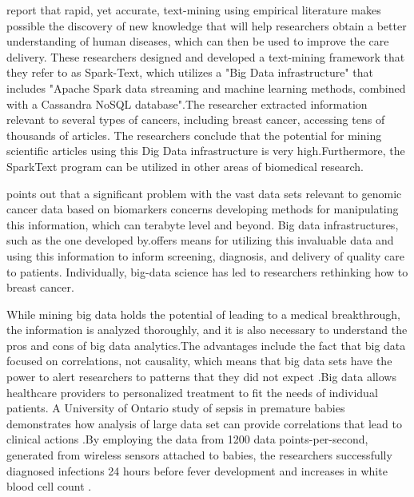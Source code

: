 \documentclass[sigconf]{acmart}
\begin{document}
\cite{ye2016}report that rapid, yet accurate, text-mining using empirical literature makes possible the discovery of new knowledge that will help researchers obtain a better understanding of human diseases, which can then be used to improve the care delivery. These researchers designed and developed a text-mining framework that they refer to as Spark-Text, which utilizes a "Big Data infrastructure" that includes "Apache Spark data streaming and machine learning methods, combined with a Cassandra NoSQL database"\cite{ye2016}.The researcher extracted information relevant to several types of cancers, including breast cancer, accessing tens of thousands of articles. The researchers conclude that the potential for mining scientific articles using this Dig Data infrastructure is very high\cite{ye2016}.Furthermore, the SparkText program can be utilized in other areas of biomedical research\cite{ye2016}.

\cite{savage2014}points out that a significant problem with the vast data sets relevant to genomic cancer data based on biomarkers concerns developing methods for manipulating this information, which can terabyte level and beyond. Big data infrastructures, such as the one developed by\cite{ye2016}.offers means for utilizing this invaluable data and using this information to inform screening, diagnosis, and delivery of quality care to patients.  Individually, big-data science has led to researchers rethinking how to breast cancer\cite{adams}.

While mining big data holds the potential of leading to a medical breakthrough, the information is analyzed thoroughly, and it is also necessary to understand the pros and cons of big data analytics\cite{bottles2014}.The advantages include the fact that big data focused on correlations, not causality, which means that big data sets have the power to alert researchers to patterns that they did not expect \cite{bottles2014}.Big data allows healthcare providers to personalized treatment to fit the needs of individual patients. A University of Ontario study of sepsis in premature babies demonstrates how analysis of large data set can provide correlations that lead to clinical actions \cite{bottles2014}.By employing the data from 1200 data points-per-second, generated from wireless sensors attached to babies, the researchers successfully diagnosed infections 24 hours before fever development and increases in white blood cell count \cite{bottles2014}.
\end{document}
